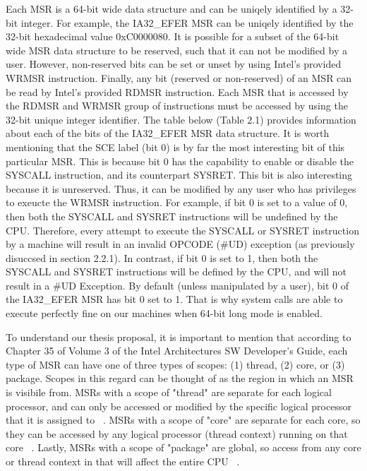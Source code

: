 \documentclass{report}
\begin{document}
\begin{spacing}{1.5}
{\large
\noindent Each MSR is a 64-bit wide data structure and can be uniqely identified by a 32-bit integer. For example, the IA32\_EFER MSR can be uniqely identified by the 32-bit hexadecimal value 0xC0000080. It is possible for a subset of the 64-bit wide MSR data structure to be reserved, such that it can not be modified by a user. However, non-reserved bits can be set or unset by using Intel's provided WRMSR instruction. Finally, any bit (reserved or non-reserved) of an MSR can be read by Intel's provided RDMSR instruction. Each MSR that is accessed by the RDMSR and WRMSR group of instructions must be accessed by using the 32-bit unique integer identifier. The table below (Table 2.1) provides information about each of the bits of the IA32\_EFER MSR data structure. It is worth mentioning that the SCE label (bit 0) is by far the most interesting bit of this particular MSR. This is because bit 0 has the capability to enable or disable the SYSCALL instruction, and its counterpart SYSRET. This bit is also interesting because it is unreserved. Thus, it can be modified by any user who has privileges to exeucte the WRMSR instruction. For example, if bit 0 is set to a value of 0, then both the SYSCALL and SYSRET instructions will be undefined by the CPU. Therefore, every attempt to execute the SYSCALL or SYSRET instruction by a machine will result in an invalid OPCODE (\#UD) exception (as previously disuccsed in section 2.2.1). In contrast, if bit 0 is set to 1, then both the SYSCALL and SYSRET instructions will be defined by the CPU, and will not result in a \#UD Exception. By default (unless manipulated by a user), bit 0 of the IA32\_EFER MSR has bit 0 set to 1. That is why system calls are able to execute perfectly fine on our machines when 64-bit long mode is enabled.
\newline
}


{\large
\noindent To understand our thesis proposal, it is important to mention that according to Chapter 35 of Volume 3 of the Intel Architectures SW Developer's Guide, each type of MSR can have one of three types of scopes: (1) thread, (2) core, or (3) package. Scopes in this regard can be thought of as the region in which an MSR is visibile from. MSRs with a scope of "thread" are separate for each logical processor, and can only be accessed or modified by the specific logical processor that it is assigned to ~\cite{intelMSRManual}. MSRs with a scope of "core" are separate for each core, so they can be accessed by any logical processor (thread context) running on that core ~\cite{intelMSRManual}. Lastly, MSRs with a scope of "package" are global, so access from any core or thread context in that will affect the entire CPU ~\cite{intelMSRManual}.
\newline
}



\end{spacing}
\end{document}
